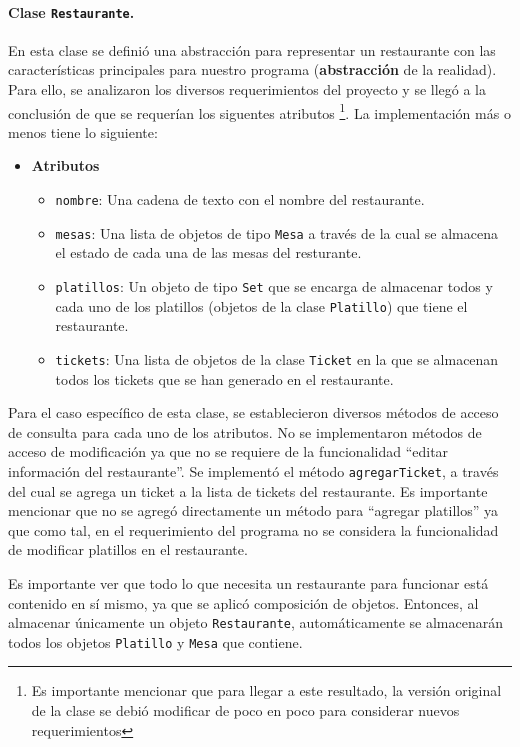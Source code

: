 \paragraph{Clase \texttt{Restaurante}.} En esta clase se definió una 
abstracción para representar un restaurante con las características 
principales para nuestro programa (\textbf{abstracción} de la realidad). Para 
ello, se analizaron los diversos requerimientos del proyecto y se llegó a la 
conclusión de que se requerían los siguentes atributos \footnote{Es importante 
mencionar que para llegar a este resultado, la versión original de la clase se
debió modificar de poco en poco para considerar nuevos requerimientos}. La 
implementación más o menos tiene lo siguiente:

\begin{itemize}
  \item \textbf{Atributos}
  \begin{itemize}
    \item \texttt{nombre}: Una cadena de texto con el nombre del restaurante.
    \item  \texttt{mesas}: Una lista de objetos de tipo \texttt{Mesa} a través 
      de la cual se almacena el estado de cada una de las mesas del resturante.
    \item \texttt{platillos}: Un objeto de tipo \texttt{Set} que se encarga de
      almacenar todos y cada uno de los platillos (objetos de la clase 
      \texttt{Platillo}) que tiene el restaurante.
    \item \texttt{tickets}: Una lista de objetos de la clase \texttt{Ticket} en 
      la que se almacenan todos los tickets que se han generado en el 
      restaurante.
  \end{itemize}
\end{itemize}

Para el caso específico de esta clase, se establecieron diversos métodos de 
acceso de consulta para cada uno de los atributos. No se implementaron métodos 
de acceso de modificación ya que no se requiere de la funcionalidad ``editar 
información del restaurante''. Se implementó el método \texttt{agregarTicket},
a través del cual se agrega un ticket a la lista de tickets del restaurante.  
Es importante mencionar que no se agregó directamente un método para ``agregar 
platillos'' ya que como tal, en el requerimiento del programa no se considera 
la funcionalidad de modificar platillos en el restaurante.

Es importante ver que todo lo que necesita un restaurante para funcionar está 
contenido en sí mismo, ya que se aplicó composición de objetos. Entonces, al 
almacenar únicamente un objeto \texttt{Restaurante}, automáticamente se 
almacenarán todos los objetos \texttt{Platillo} y \texttt{Mesa} que contiene.

